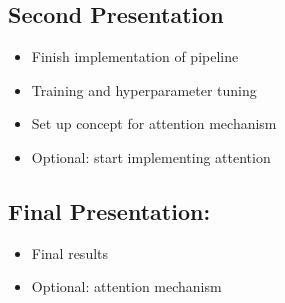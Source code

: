 \documentclass[10pt,twocolumn,letterpaper]{article}
\begin{document}
\subsection{Second Presentation}
\begin{itemize}
	\setlength\itemsep{0em}
	\item Finish implementation of pipeline
	\item Training and hyperparameter tuning
	\item Set up concept for attention mechanism
	\item Optional: start implementing attention
\end{itemize}

\subsection{Final Presentation:}
\begin{itemize}
	\setlength\itemsep{0em}
	\item Final results
	\item Optional: attention mechanism
\end{itemize}

{\small


}
\end{document}
